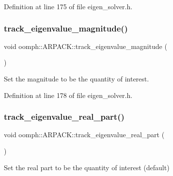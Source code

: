 Definition at line 175 of file eigen\+\_\+solver.\+h.

\mbox{\label{classoomph_1_1ARPACK_a94e5065868bc3c3187f15e9220314383}} 
\subsubsection{\texorpdfstring{track\+\_\+eigenvalue\+\_\+magnitude()}{track\_eigenvalue\_magnitude()}}
{\footnotesize\ttfamily void oomph\+::\+A\+R\+P\+A\+C\+K\+::track\+\_\+eigenvalue\+\_\+magnitude (\begin{DoxyParamCaption}{ }\end{DoxyParamCaption})\hspace{0.3cm}{\ttfamily [inline]}}



Set the magnitude to be the quantity of interest. 



Definition at line 178 of file eigen\+\_\+solver.\+h.

\mbox{\label{classoomph_1_1ARPACK_aa936a369ba1e4fd65e971ba5945ae2d8}} 
\subsubsection{\texorpdfstring{track\+\_\+eigenvalue\+\_\+real\+\_\+part()}{track\_eigenvalue\_real\_part()}}
{\footnotesize\ttfamily void oomph\+::\+A\+R\+P\+A\+C\+K\+::track\+\_\+eigenvalue\+\_\+real\+\_\+part (\begin{DoxyParamCaption}{ }\end{DoxyParamCaption})\hspace{0.3cm}{\ttfamily [inline]}}



Set the real part to be the quantity of interest (default) 



